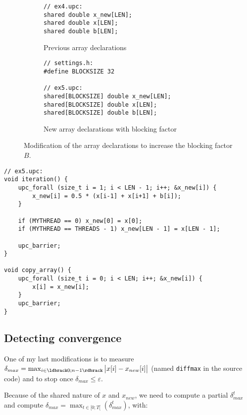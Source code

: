 \documentclass[12pt]{article}
\begin{document}
\begin{figure}[ht]
  \begin{subfigure}[b]{0.49\columnwidth}
    \begin{lstlisting}[style=C, numbers=none]
// ex4.upc:
shared double x_new[LEN];
shared double x[LEN];
shared double b[LEN];
    \end{lstlisting}
    \caption{Previous array declarations}
  \end{subfigure}
  \hfill
  \begin{subfigure}[b]{0.49\columnwidth}
    \begin{lstlisting}[style=C, numbers=none]
// settings.h:
#define BLOCKSIZE 32

// ex5.upc:
shared[BLOCKSIZE] double x_new[LEN];
shared[BLOCKSIZE] double x[LEN];
shared[BLOCKSIZE] double b[LEN];
    \end{lstlisting}
    \caption{New array declarations with blocking factor}
  \end{subfigure}
  \caption{Modification of the array declarations to increase the blocking factor $B$.}
  \label{fig:laplace45a}
\end{figure}

\begin{lstlisting}[style=C, numbers=none, caption={New \texttt{iteration()} and \texttt{copy\_array()} implementations}, label={fig:laplace45b}]
// ex5.upc:
void iteration() {
    upc_forall (size_t i = 1; i < LEN - 1; i++; &x_new[i]) {
        x_new[i] = 0.5 * (x[i-1] + x[i+1] + b[i]);
    }

    if (MYTHREAD == 0) x_new[0] = x[0];
    if (MYTHREAD == THREADS - 1) x_new[LEN - 1] = x[LEN - 1];

    upc_barrier;
}

void copy_array() {
    upc_forall (size_t i = 0; i < LEN; i++; &x_new[i]) {
        x[i] = x_new[i];
    }
    upc_barrier;
}
\end{lstlisting}

\newpage

\subsection{Detecting convergence}

One of my last modifications is to measure $\delta_{max} = \max_{i\in \ldbrack 0; n-1 \rdbrack}{\bigl\vert x[i]-x_{new}[i] \bigr\vert}$ (named \texttt{diffmax} in the source code) and to stop once $\delta_{max} \leq \varepsilon$.

Because of the shared nature of $x$ and $x_{new}$, we need to compute a partial $\delta_{max}^t$ and compute $\delta_{max} = \max_{t \in [0; T[}(\delta_{max}^t)$, with:
\end{document}
